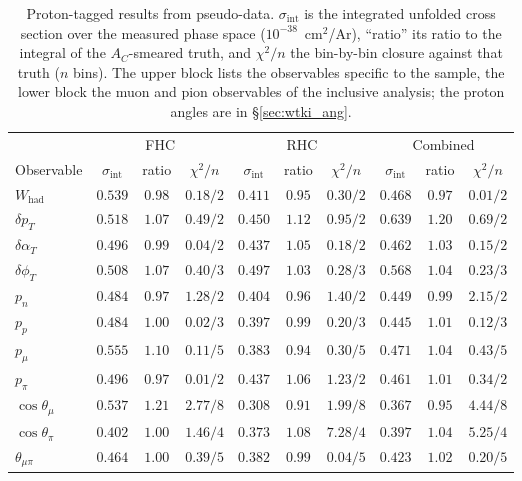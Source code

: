 \documentclass[11pt,a4paper]{article}
\begin{document}
\begin{table}[H]
  \centering
  \caption{Proton-tagged results from pseudo-data. $\sigma_\mathrm{int}$ is the integrated unfolded cross
    section over the measured phase space ($10^{-38}$~cm$^2$/Ar), ``ratio'' its ratio to the integral of the
    $A_C$-smeared truth, and $\chi^2/n$ the bin-by-bin closure against that truth ($n$ bins). The upper
    block lists the observables specific to the sample, the lower block the muon and pion observables of
    the inclusive analysis; the proton angles are in \S\ref{sec:wtki_ang}.}
  \label{tab:wtki}
  \footnotesize\setlength{\tabcolsep}{3.5pt}
  \begin{tabular}{lccccccccc}
\toprule
& \multicolumn{3}{c}{FHC} & \multicolumn{3}{c}{RHC} & \multicolumn{3}{c}{Combined} \\
\cmidrule(lr){2-4}\cmidrule(lr){5-7}\cmidrule(lr){8-10}
Observable & $\sigma_\mathrm{int}$ & ratio & $\chi^2/n$ & $\sigma_\mathrm{int}$ & ratio & $\chi^2/n$ & $\sigma_\mathrm{int}$ & ratio & $\chi^2/n$ \\
\midrule
      $W_\mathrm{had}$   & $0.539$ & $0.98$ & $0.18/2$ & $0.411$ & $0.95$ & $0.30/2$ & $0.468$ & $0.97$ & $0.01/2$ \\
      $\delta p_T$       & $0.518$ & $1.07$ & $0.49/2$ & $0.450$ & $1.12$ & $0.95/2$ & $0.639$ & $1.20$ & $0.69/2$ \\
      $\delta\alpha_T$   & $0.496$ & $0.99$ & $0.04/2$ & $0.437$ & $1.05$ & $0.18/2$ & $0.462$ & $1.03$ & $0.15/2$ \\
      $\delta\phi_T$     & $0.508$ & $1.07$ & $0.40/3$ & $0.497$ & $1.03$ & $0.28/3$ & $0.568$ & $1.04$ & $0.23/3$ \\
      $p_n$              & $0.484$ & $0.97$ & $1.28/2$ & $0.404$ & $0.96$ & $1.40/2$ & $0.449$ & $0.99$ & $2.15/2$ \\
      $p_p$              & $0.484$ & $1.00$ & $0.02/3$ & $0.397$ & $0.99$ & $0.20/3$ & $0.445$ & $1.01$ & $0.12/3$ \\
      \midrule
      $p_\mu$            & $0.555$ & $1.10$ & $0.11/5$ & $0.383$ & $0.94$ & $0.30/5$ & $0.471$ & $1.04$ & $0.43/5$ \\
      $p_\pi$            & $0.496$ & $0.97$ & $0.01/2$ & $0.437$ & $1.06$ & $1.23/2$ & $0.461$ & $1.01$ & $0.34/2$ \\
      $\cos\theta_\mu$   & $0.537$ & $1.21$ & $2.77/8$ & $0.308$ & $0.91$ & $1.99/8$ & $0.367$ & $0.95$ & $4.44/8$ \\
      $\cos\theta_\pi$   & $0.402$ & $1.00$ & $1.46/4$ & $0.373$ & $1.08$ & $7.28/4$ & $0.397$ & $1.04$ & $5.25/4$ \\
      $\theta_{\mu\pi}$  & $0.464$ & $1.00$ & $0.39/5$ & $0.382$ & $0.99$ & $0.04/5$ & $0.423$ & $1.02$ & $0.20/5$ \\
\bottomrule
\end{tabular}
\end{table}
\end{document}
